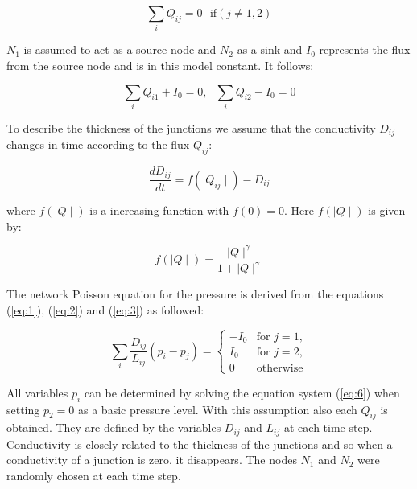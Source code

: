 \documentclass[11pt]{scrartcl}
\begin{document}
\begin{equation}
	\label{eq:2}
	\sum_{i} Q_{ij}=0 \,\,\,\, \mathrm{if} \left(j\ne 1,2\right)
\end{equation}

$N_1$ is assumed to act as a source node and $N_2$ as a sink and $I_0$ represents the flux from the source node and is in this model constant. It follows:

\begin{equation}
	\label{eq:3}
	\sum_{i} Q_{i1}+I_0=0, \,\,\,\, \sum_{i} Q_{i2}-I_0=0
\end{equation}

To describe the thickness of the junctions we assume that the conductivity $D_{ij}$ changes in time according to the flux $Q_{ij}$:

\begin{equation}
	\label{eq:4}
	\frac{dD_{ij}}{dt}=f\left(\mid Q_{ij} \mid \right)-D_{ij}
\end{equation}

where $f\left(\mid Q \mid \right)$ is a increasing function with $f(0)=0$. Here $f\left(\mid Q \mid \right)$ is given by:

\begin{equation}
	\label{eq:5}
	f\left(\mid Q \mid \right)=\frac{\mid Q \mid^\gamma }{1+\mid Q \mid^\gamma}
\end{equation}

The network Poisson equation for the pressure is derived from the equations (\ref{eq:1}), (\ref{eq:2}) and (\ref{eq:3}) as followed:

\begin{equation}
	\label{eq:6}
	\sum_{i} \frac{D_{ij}}{L_{ij}}\left(p_i-p_j\right)= \begin{cases}
										-I_0 & \mathrm{for}\,\, j=1,\\
										I_0 & \mathrm{for} \,\,j=2,\\
										0 & \mathrm{otherwise}
										\end{cases}
\end{equation}

All variables $p_i$ can be determined by solving the equation system (\ref{eq:6}) when setting $p_2=0$ as a basic pressure level. With this assumption also each $Q_{ij}$ is obtained. They are defined by the variables $D_{ij}$ and $L_{ij}$  at each time step. Conductivity is closely related to the thickness of the junctions and so when a conductivity of a junction is zero, it disappears. The nodes $N_1$ and $N_2$ were randomly chosen at each time step.
\end{document}
